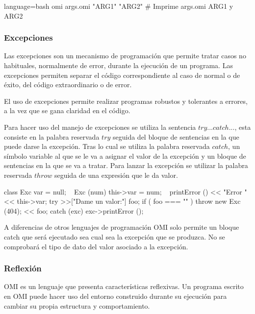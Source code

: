  \begin{myverbatim}{language=bash}
   omi args.omi "ARG1" "ARG2" # Imprime args.omi ARG1 y ARG2
\end{myverbatim}

\subsubsection{Excepciones} \label{sec:exception}

Las excepciones son un mecanismo de programación que permite tratar casos no habituales, normalmente de error, durante la ejecución de un programa. Las excepciones
permiten separar el código correspondiente al caso de normal o de éxito, del código extraordinario o de error. 

El uso de excepciones permite realizar programas robustos y tolerantes a errores, a la vez que se gana claridad en el código.

Para hacer uso del manejo de excepciones se utiliza la sentencia $try...catch...$, esta consiste en la palabra reservada $try$ seguida del bloque de 
sentencias en la que puede darse la excepción. Tras lo cual se utiliza la palabra reservada $catch$, un símbolo variable al que se le va a asignar el valor de la excepción y un bloque de 
sentencias en la que se va a tratar. Para lanzar la excepción se utilizar la palabra reservada $throw$ seguida de una expresión que le da valor. \\

\begin{myverbatim}
   class Exc {
      var = null;
      ~ Exc (num) {
         this->var = num;
      }
      ~ printError () {
         << "Error " << this->var;
      }
   }
   try {
      >>["Dame un valor:"] foo;
      if ( foo === "" ){
         throw new Exc (404);
      } 
      << foo;
   }catch (exc) {
      exc->printError ();
   }
\end{myverbatim}

A diferencias de otros lenguajes de programación OMI solo permite un bloque catch que será ejecutado sea cual sea la excepción que se produzca. No se comprobará el 
tipo de dato del valor asociado a la excepción. 

\subsubsection{Reflexión}
OMI es un lenguaje que presenta características reflexivas. Un programa escrito en OMI puede hacer uso del entorno construido durante su ejecución para cambiar su propia estructura
y comportamiento.

